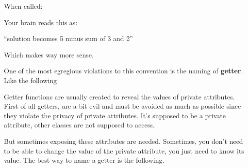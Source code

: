 When called:

\begin{Shaded}
\begin{Highlighting}[]
\OperatorTok{=}  \OperatorTok{{-}} \NormalTok{(}\NormalTok{,}\NormalTok{)}
\end{Highlighting}
\end{Shaded}

Your brain reads this as:

``solution becomes 5 minus sum of 3 and 2''

Which makes way more sense.

One of the most egregious violations to this convention is the naming of
\textbf{getter}. Like the following

\begin{Shaded}
\begin{Highlighting}[]
\NormalTok{):}
     
\end{Highlighting}
\end{Shaded}

\begin{Shaded}
\begin{Highlighting}[]
\NormalTok{(} \OperatorTok{+}
\end{Highlighting}
\end{Shaded}

Getter functions are usually created to reveal the values of private
attributes. First of all getters, are a bit evil and must be avoided as
much as possible since they violate the privacy of private attributes.
It's supposed to be a private attribute, other classes are not supposed
to access.

But sometimes exposing these attributes are needed. Sometimes, you don't
need to be able to change the value of the private attribute, you just
need to know its value. The best way to name a getter is the following.

\begin{Shaded}
\begin{Highlighting}[]
\NormalTok{):}
     
\end{Highlighting}
\end{Shaded}

